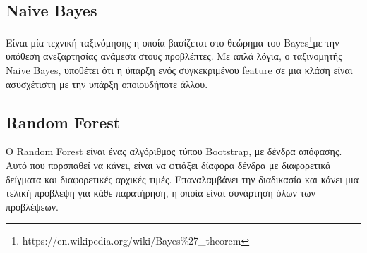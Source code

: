 \subsection{Naive Bayes}

Είναι μία τεχνική ταξινόμησης η οποία βασίζεται στο θεώρημα του Bayes\footnote{https://en.wikipedia.org/wiki/Bayes\%27\_theorem}με την υπόθεση ανεξαρτησίας ανάμεσα στους προβλέπτες. Με απλά λόγια, ο ταξινομητής Naive Bayes, υποθέτει ότι η ύπαρξη ενός συγκεκριμένου feature σε μια κλάση είναι ασυσχέτιστη με την υπάρξη οποιουδήποτε άλλου. 

\subsection{Random Forest}

O Random Forest είναι ένας αλγόριθμος τύπου Bootstrap, με δένδρα απόφασης. Αυτό που πορσπαθεί να κάνει, είναι να φτιάξει δίαφορα δένδρα με διαφορετικά δείγματα και διαφορετικές αρχικές τιμές. Επαναλαμβάνει την διαδικασία και κάνει μια τελική πρόβλεψη για κάθε παρατήρηση, η οποία είναι συνάρτηση όλων των προβλέψεων.

\hfill





